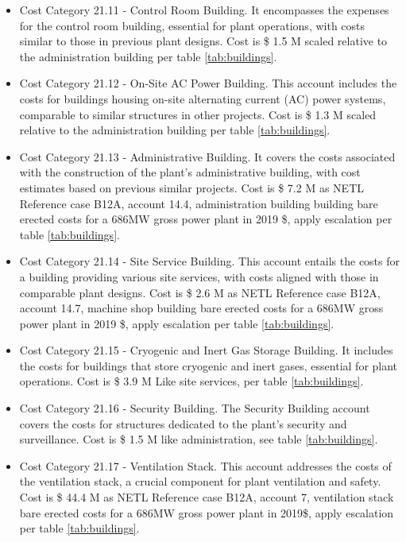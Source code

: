 \begin{itemize}
\item Cost Category 21.11 - Control Room Building. It encompasses the expenses for the control room building, essential for plant operations, with costs similar to those in previous plant designs.  Cost is \$ 1.5 M scaled relative to the administration building per table \ref{tab:buildings}. 
\item Cost Category 21.12 - On-Site AC Power Building. This account includes the costs for buildings housing on-site alternating current (AC) power systems, comparable to similar structures in other projects.  Cost is \$ 1.3 M scaled relative to the administration building per table \ref{tab:buildings}. 
\item Cost Category 21.13 - Administrative Building. It covers the costs associated with the construction of the plant’s administrative building, with cost estimates based on previous similar projects. Cost is \$ 7.2 M as NETL Reference case B12A, account 14.4, administration building building bare erected costs for a 686MW gross power plant in 2019 \$, apply escalation per table \ref{tab:buildings}. 
\item Cost Category 21.14 - Site Service Building. This account entails the costs for a building providing various site services, with costs aligned with those in comparable plant designs. Cost is \$ 2.6 M as NETL Reference case B12A, account 14.7, machine shop building bare erected costs for a 686MW gross power plant in 2019 \$, apply escalation per table \ref{tab:buildings}. 
\item Cost Category 21.15 - Cryogenic and Inert Gas Storage Building. It includes the costs for buildings that store cryogenic and inert gases, essential for plant operations.  Cost is \$ 3.9 M Like site services, per table \ref{tab:buildings}. 
\item Cost Category 21.16 - Security Building. The Security Building account covers the costs for structures dedicated to the plant’s security and surveillance. Cost is \$ 1.5 M like administration, see table \ref{tab:buildings}. 
\item Cost Category 21.17 - Ventilation Stack. This account addresses the costs of the ventilation stack, a crucial component for plant ventilation and safety. Cost is \$ 44.4 M as NETL Reference case B12A, account 7, ventilation stack bare erected costs for a 686MW gross power plant in 2019\$, apply escalation per table \ref{tab:buildings}.
\end{itemize}









